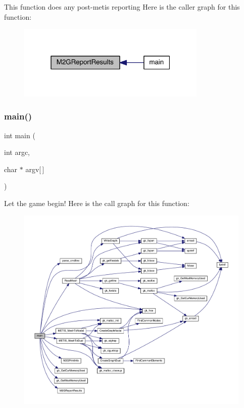 This function does any post-\/metis reporting Here is the caller graph for this function\+:\nopagebreak
\begin{figure}[H]
\begin{center}
\leavevmode
\includegraphics[width=256pt]{a00317_a1830d2cc04f766d0cf9f16cbf81d0a4b_icgraph}
\end{center}
\end{figure}
\mbox{\label{a00317_a0ddf1224851353fc92bfbff6f499fa97}} 
\subsubsection{\texorpdfstring{main()}{main()}}
{\footnotesize\ttfamily int main (\begin{DoxyParamCaption}\item[{int}]{argc,  }\item[{char $\ast$}]{argv\mbox{[}$\,$\mbox{]} }\end{DoxyParamCaption})}

Let the game begin! Here is the call graph for this function\+:\nopagebreak
\begin{figure}[H]
\begin{center}
\leavevmode
\includegraphics[width=350pt]{a00317_a0ddf1224851353fc92bfbff6f499fa97_cgraph}
\end{center}
\end{figure}

